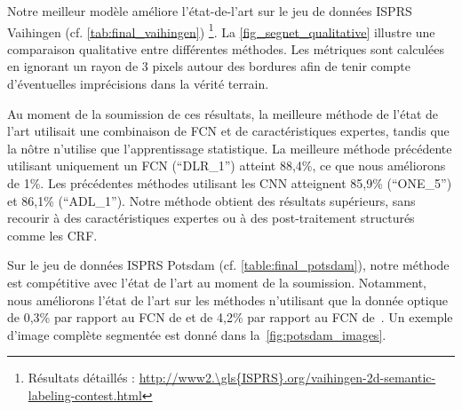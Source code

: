 Notre meilleur modèle améliore l'état-de-l'art sur le jeu de données \gls{ISPRS} Vaihingen (cf. \cref{tab:final_vaihingen}) \footnote{Résultats détaillés : \url{http://www2.\gls{ISPRS}.org/vaihingen-2d-semantic-labeling-contest.html}}. La \cref{fig_segnet_qualitative} illustre une comparaison qualitative entre différentes méthodes. Les métriques sont calculées en ignorant un rayon de $3$ pixels autour des bordures afin de tenir compte d'éventuelles imprécisions dans la vérité terrain.

Au moment de la soumission de ces résultats, la meilleure méthode de l'état de l'art utilisait une combinaison de \gls{FCN} et de caractéristiques expertes, tandis que la nôtre n'utilise que l'apprentissage statistique. La meilleure méthode précédente utilisant uniquement un \gls{FCN} (``DLR\_1'') atteint 88,4\%, ce que nous améliorons de 1\%. Les précédentes méthodes utilisant les \gls{CNN} atteignent 85,9\% (``ONE\_5''\cite{boulch_dag_2015}) et 86,1\% (``ADL\_1''\cite{paisitkriangkrai_effective_2015}). Notre méthode obtient des résultats supérieurs, sans recourir à des caractéristiques expertes ou à des post-traitement structurés comme les \gls{CRF}.

Sur le jeu de données \gls{ISPRS} Potsdam (cf. \cref{table:final_potsdam}), notre méthode est compétitive avec l'état de l'art au moment de la soumission. Notamment, nous améliorons l'état de l'art sur les méthodes n'utilisant que la donnée optique de 0,3\% par rapport au \gls{FCN} de \citet{sherrah_fully_2016} et de 4,2\% par rapport au \gls{FCN} de~\citet{volpi_dense_2017}. Un exemple d'image complète segmentée est donné dans la~\cref{fig:potsdam_images}.

